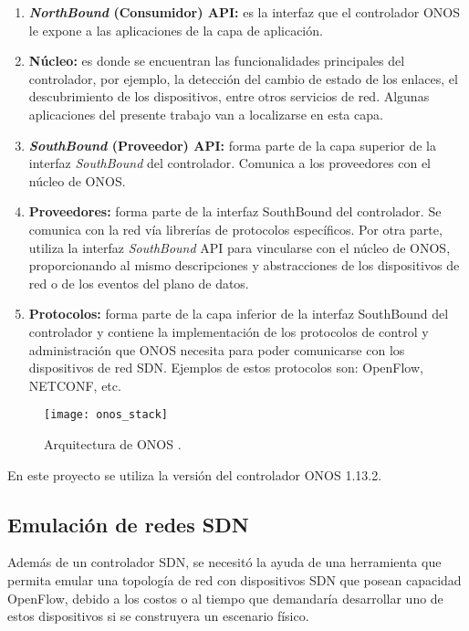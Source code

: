 \begin{enumerate}
\item {\textbf{\textit{NorthBound} (Consumidor) API:} es la interfaz que el
    controlador ONOS le expone a las aplicaciones de la capa de aplicación.}
\item {\textbf{Núcleo:} es donde se encuentran las funcionalidades principales del
    controlador, por ejemplo, la detección del cambio de estado de los enlaces,
    el descubrimiento de los dispositivos, entre otros servicios de red. Algunas
    aplicaciones del presente trabajo van a localizarse en esta capa.}
\item {\textbf{\textit{SouthBound} (Proveedor) API:} forma parte de la capa
    superior de la interfaz \textit{SouthBound} del controlador. Comunica a los
    proveedores con el núcleo de ONOS.}
\item {\textbf{Proveedores:} forma parte de la interfaz SouthBound del
    controlador. Se comunica con la red vía librerías de protocolos específicos.
    Por otra parte, utiliza la interfaz \textit{SouthBound} API para vincularse
    con el núcleo de ONOS, proporcionando al mismo descripciones y abstracciones
    de los dispositivos de red o de los eventos del plano de datos. }
\item {\textbf{Protocolos:} forma parte de la capa inferior de la interfaz
    SouthBound del controlador y contiene la implementación de los protocolos de
    control y administración que ONOS necesita para poder comunicarse con los
    dispositivos de red SDN. Ejemplos de estos protocolos son: OpenFlow,
    NETCONF, etc.}
\end {enumerate}


\begin{figure}[h]
	\centering 
	\texttt{[image: onos\_stack]}
	\caption[Arquitectura de ONOS]{Arquitectura de ONOS \parencite{onos_wiki}.}
	\label{fig:arquitectura_onos}
\end{figure}

En este proyecto se utiliza la versión del controlador ONOS 1.13.2.

\subsection{Emulación de redes SDN}

Además de un controlador SDN, se necesitó la ayuda de una herramienta que
permita emular una topología de red con dispositivos SDN que posean capacidad
OpenFlow, debido a los costos o al tiempo que demandaría desarrollar uno de
estos dispositivos si se construyera un escenario físico.

